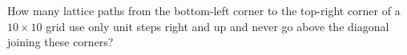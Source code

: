 How many lattice paths from the bottom-left corner to the top-right corner of a $10\times10$ grid use only unit steps right and up and never go above the diagonal joining these corners?

